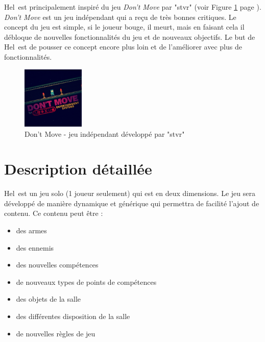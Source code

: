 \documentclass[11pt, a4paper, oneside]{report}
\newcommand{\projectTitle}{Hel}
\begin{document}
\projectTitle~est principalement inspiré du jeu \emph{Don't Move} par "stvr" (voir Figure \ref{fig:dontmove} page \pageref{fig:dontmove}). \emph{Don't Move} est un jeu indépendant qui a reçu de très bonnes critiques. Le concept du jeu est simple, si le joueur bouge, il meurt, mais en faisant cela il débloque de nouvelles fonctionnalités du jeu et de nouveaux objectifs. Le but de \projectTitle~est de pousser ce concept encore plus loin et de l'améliorer avec plus de fonctionnalités.

\begin{figure}[h]
	\begin{center}
	\includegraphics[width=0.265\textwidth]{dontmove}
	\caption{Don't Move - jeu indépendant développé par "stvr"}
	\label{fig:dontmove}
	\end{center}
\end{figure}

\section{Description détaillée}
\projectTitle~est un jeu solo (1 joueur seulement) qui est en deux dimensions. Le jeu sera développé de manière dynamique et générique qui permettra de facilité l'ajout de contenu. Ce contenu peut être :
\begin{multicols}{2}
\begin{itemize}
	\item des armes
	\item des ennemis
	\item des nouvelles compétences
	\item de nouveaux types de points de compétences
	\item des objets de la salle
	\item des différentes disposition de la salle
	\item de nouvelles règles de jeu
\end{itemize}
\end{multicols}
\end{document}
